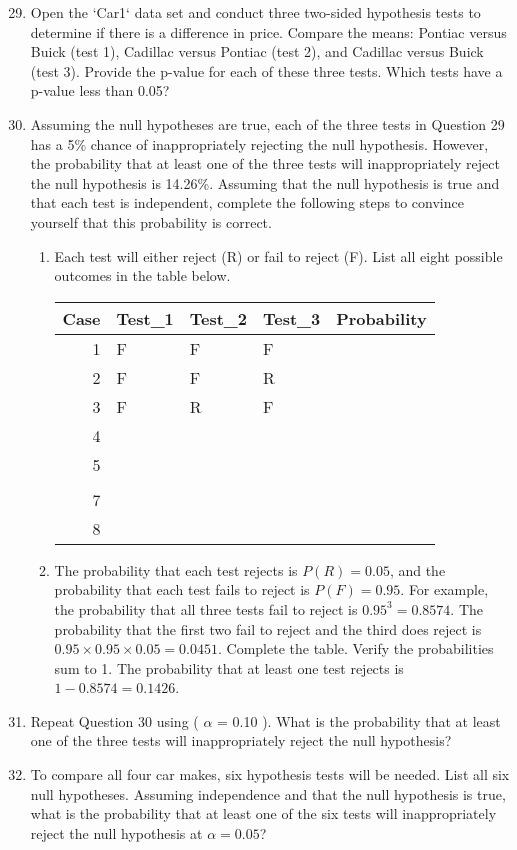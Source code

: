 \documentclass[
]{report}
\theoremstyle{definition}
\theoremstyle{definition}
\theoremstyle{definition}
\theoremstyle{definition}
\theoremstyle{remark}
\begin{document}
\begin{enumerate}
  \setcounter{enumi}{28}

  \item Open the `Car1` data set and conduct three two-sided hypothesis tests to determine if there is a difference in price. Compare the means: Pontiac versus Buick (test 1), Cadillac versus Pontiac (test 2), and Cadillac versus Buick (test 3). Provide the p-value for each of these three tests. Which tests have a p-value less than 0.05?

  \item Assuming the null hypotheses are true, each of the three tests in Question 29 has a 5\% chance of inappropriately rejecting the null hypothesis. However, the probability that at least one of the three tests will inappropriately reject the null hypothesis is 14.26\%. Assuming that the null hypothesis is true and that each test is independent, complete the following steps to convince yourself that this probability is correct.
    \begin{enumerate}
      \item Each test will either reject (R) or fail to reject (F). List all eight possible outcomes in the table below.

\begin{tabular}{rllll}
\toprule
Case & Test\_1 & Test\_2 & Test\_3 & Probability\\
\midrule
1 & F & F & F & \\
2 & F & F & R & \\
3 & F & R & F & \\
4 &  &  &  & \\
5 &  &  &  & \\
\addlinespace
6 &  &  &  & \\
7 &  &  &  & \\
8 &  &  &  & \\
\bottomrule
\end{tabular}


      
      \item The probability that each test rejects is \( P(R) = 0.05 \), and the probability that each test fails to reject is \( P(F) = 0.95 \). For example, the probability that all three tests fail to reject is \( 0.95^3 = 0.8574 \). The probability that the first two fail to reject and the third does reject is \( 0.95 \times 0.95 \times 0.05 = 0.0451 \). Complete the table. Verify the probabilities sum to 1. The probability that at least one test rejects is \( 1 - 0.8574 = 0.1426 \).
    \end{enumerate}

  \item Repeat Question 30 using ( $\alpha$ = 0.10 ). What is the probability that at least one of the three tests will inappropriately reject the null hypothesis?

  \item To compare all four car makes, six hypothesis tests will be needed. List all six null hypotheses. Assuming independence and that the null hypothesis is true, what is the probability that at least one of the six tests will inappropriately reject the null hypothesis at \( \alpha = 0.05 \)?
\end{enumerate}
\end{document}

